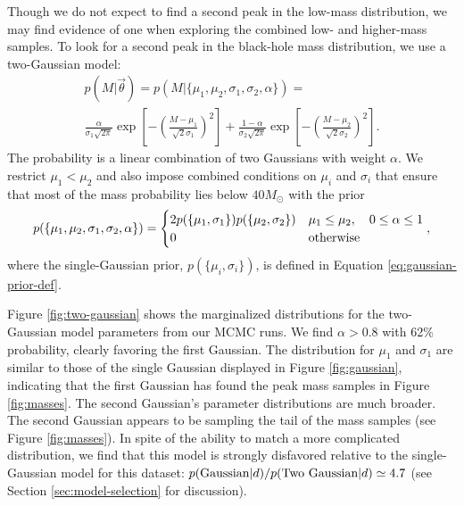 \documentclass[preprint]{aastex}
\newcommand{\Msun}{M_\odot}
\newcommand{\vtheta}{\vec{\theta}}
\begin{document}
Though we do not expect to find a second peak in the low-mass
distribution, we may find evidence of one when exploring the combined
low- and higher-mass samples.  To look for a second peak in the
black-hole mass distribution, we use a two-Gaussian model:
\begin{multline}
  \label{eq:two-gaussian-def}
  p(M|\vtheta) = p(M|\{\mu_1, \mu_2, \sigma_1, \sigma_2, \alpha\}) = \\
  \frac{\alpha}{\sigma_1 \sqrt{2\pi}} \exp\left[ - \left( \frac{M -
        \mu_1}{\sqrt{2}\sigma_1} \right)^2 \right] + \frac{1-\alpha}{\sigma_2 \sqrt{2\pi}} \exp\left[ - \left( \frac{M -
        \mu_2}{\sqrt{2}\sigma_2} \right)^2 \right].
\end{multline}
The probability is a linear combination of two Gaussians with weight
$\alpha$.  We restrict $\mu_1 < \mu_2$ and also impose combined
conditions on $\mu_i$ and $\sigma_i$ that ensure that most of the mass
probability lies below $40 \Msun$ with the prior 
\begin{equation}
  p(\{\mu_1, \mu_2, \sigma_1, \sigma_2, \alpha\}) = 
  \begin{cases}
    2 p(\{\mu_1, \sigma_1\}) p(\{\mu_2, \sigma_2\}) & \mu_1 \leq
    \mu_2, \quad 0 \leq \alpha \leq 1 \\
    0 & \textnormal{otherwise}
  \end{cases},
\end{equation}
where the single-Gaussian prior, $p(\{\mu_i, \sigma_i\})$, is defined
in Equation \eqref{eq:gaussian-prior-def}.

Figure \ref{fig:two-gaussian} shows the marginalized distributions for
the two-Gaussian model parameters from our MCMC runs.  We find $\alpha
> 0.8$ with 62\% probability, clearly favoring the first Gaussian.
The distribution for $\mu_1$ and $\sigma_1$ are similar to those of
the single Gaussian displayed in Figure \ref{fig:gaussian}, indicating
that the first Gaussian has found the peak mass samples in Figure
\ref{fig:masses}.  The second Gaussian's parameter distributions are
much broader.  The second Gaussian appears to be sampling the tail of
the mass samples (see Figure \ref{fig:masses}).  In spite of the
ability to match a more complicated distribution, we find that this
model is strongly disfavored relative to the single-Gaussian model for
this dataset: $p(\textnormal{Gaussian}|d) / p(\textnormal{Two
  Gaussian}|d) \simeq 4.7$ (see Section \ref{sec:model-selection} for
discussion).
\end{document}
